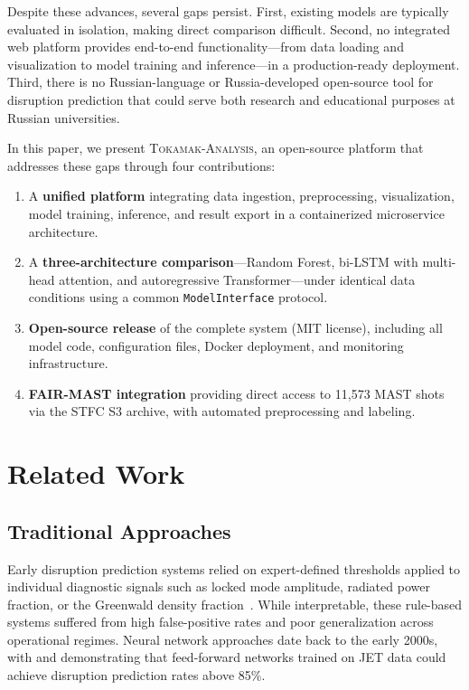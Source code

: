 \documentclass[twocolumn]{article}
\begin{document}
Despite these advances, several gaps persist.
First, existing models are typically evaluated in isolation,
making direct comparison difficult.
Second, no integrated web platform provides end-to-end
functionality---from data loading and visualization to
model training and inference---in a production-ready
deployment.
Third, there is no Russian-language or Russia-developed
open-source tool for disruption prediction that could
serve both research and educational purposes at Russian
universities.

In this paper, we present \textsc{Tokamak-Analysis},
an open-source platform that addresses these gaps through
four contributions:
\begin{enumerate}[noitemsep]
  \item A \textbf{unified platform} integrating data ingestion,
        preprocessing, visualization, model training, inference,
        and result export in a containerized microservice
        architecture.
  \item A \textbf{three-architecture comparison}---Random Forest,
        bi-LSTM with multi-head attention, and autoregressive
        Transformer---under identical data conditions using
        a common \texttt{ModelInterface} protocol.
  \item \textbf{Open-source release} of the complete system
        (MIT license), including all model code, configuration
        files, Docker deployment, and monitoring infrastructure.
  \item \textbf{FAIR-MAST integration} providing direct access
        to 11{,}573 MAST shots via the STFC S3 archive,
        with automated preprocessing and labeling.
\end{enumerate}


\section{Related Work}
\label{sec:related}

\subsection{Traditional Approaches}

Early disruption prediction systems relied on expert-defined
thresholds applied to individual diagnostic signals such as
locked mode amplitude, radiated power fraction, or the
Greenwald density fraction~\citep{schuller1995, devries2011}.
While interpretable, these rule-based systems suffered from
high false-positive rates and poor generalization across
operational regimes.
Neural network approaches date back to the early 2000s,
with \citet{cannas2004} and \citet{windsor2005} demonstrating
that feed-forward networks trained on JET data could achieve
disruption prediction rates above 85\%.
\end{document}
